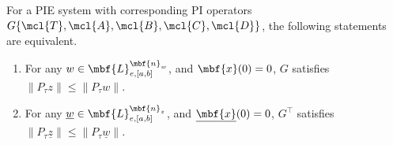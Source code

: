 

\begin{theorem}\label{thm:duall2gain}
	For a PIE system with corresponding PI operators $G\{\mcl{T}, \mcl{A}, \mcl{B}, \mcl{C}, \mcl{D}\}$, the following statements are equivalent.
	\begin{enumerate}
		\item For any $w\in\mbf{L}_{e,[a,b]}^{\mbf{n}_w}$, and $\mbf{x}(0)=0$, $G$  satisfies $\|P_\tau {z}\| \leq \|P_\tau {w}\|$.
		\item For any $\underline{w}\in\mbf{L}_{e,[a,b]}^{\mbf{n}_z}$, and $\underline{\mbf{x}}(0)=0$, $G^\top$ satisfies $\|P_\tau \underline{z}\| \leq \|P_\tau \underline{w}\|$.
	\end{enumerate}
\end{theorem}

